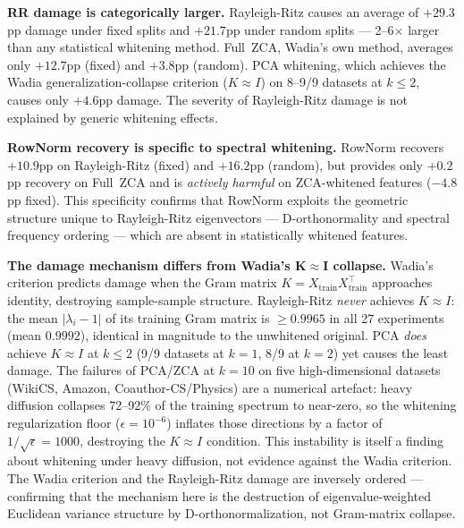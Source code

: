 \documentclass[11pt]{article}
\begin{document}
\noindent\textbf{RR damage is categorically larger.}
Rayleigh-Ritz causes an average of $+29.3$pp damage under fixed splits and $+21.7$pp
under random splits --- 2--6$\times$ larger than any statistical whitening method.
Full~ZCA, Wadia's own method, averages only $+12.7$pp (fixed) and $+3.8$pp (random).
PCA whitening, which achieves the Wadia generalization-collapse criterion
($K \approx I$) on 8--9/9 datasets at $k \leq 2$, causes only $+4.6$pp damage.
The severity of Rayleigh-Ritz damage is not explained by generic whitening effects.

\noindent\textbf{RowNorm recovery is specific to spectral whitening.}
RowNorm recovers $+10.9$pp on Rayleigh-Ritz (fixed) and $+16.2$pp (random), but
provides only $+0.2$pp recovery on Full~ZCA and is \emph{actively harmful} on
ZCA-whitened features ($-4.8$pp fixed).  This specificity confirms that RowNorm
exploits the geometric structure unique to Rayleigh-Ritz eigenvectors ---
D-orthonormality and spectral frequency ordering --- which are absent in
statistically whitened features.

\noindent\textbf{The damage mechanism differs from Wadia's K$\approx$I collapse.}
Wadia's criterion predicts damage when the Gram matrix $K = X_{\mathrm{train}}
X_{\mathrm{train}}^\top$ approaches identity, destroying sample-sample structure.
Rayleigh-Ritz \emph{never} achieves $K \approx I$: the mean $|\lambda_i - 1|$
of its training Gram matrix is $\geq 0.9965$ in all 27 experiments (mean
$0.9992$), identical in magnitude to the unwhitened original.  PCA \emph{does}
achieve $K \approx I$ at $k \leq 2$ (9/9 datasets at $k{=}1$, 8/9 at $k{=}2$)
yet causes the least damage.  The failures of PCA/ZCA at $k{=}10$ on five
high-dimensional datasets (WikiCS, Amazon, Coauthor-CS/Physics) are a
numerical artefact: heavy diffusion collapses 72--92\% of the training
spectrum to near-zero, so the whitening regularization floor ($\epsilon = 10^{-6}$)
inflates those directions by a factor of $1/\sqrt{\epsilon} = 1000$, destroying
the $K \approx I$
condition.  This instability is itself a finding about whitening under heavy
diffusion, not evidence against the Wadia criterion.  The Wadia criterion and
the Rayleigh-Ritz damage are inversely ordered --- confirming that the mechanism
here is the destruction of eigenvalue-weighted Euclidean variance structure by
D-orthonormalization, not Gram-matrix collapse.
\end{document}
